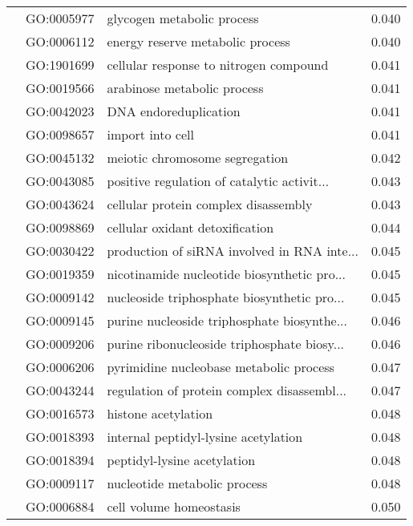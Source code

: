 \begin{longtable}{lllr}
   & GO:0005977 &                   glycogen metabolic process &         0.040 \\
   & GO:0006112 &             energy reserve metabolic process &         0.040 \\
   & GO:1901699 &       cellular response to nitrogen compound &         0.041 \\
   & GO:0019566 &                  arabinose metabolic process &         0.041 \\
   & GO:0042023 &                        DNA endoreduplication &         0.041 \\
   & GO:0098657 &                             import into cell &         0.041 \\
   & GO:0045132 &               meiotic chromosome segregation &         0.042 \\
   & GO:0043085 &  positive regulation of catalytic activit... &         0.043 \\
   & GO:0043624 &         cellular protein complex disassembly &         0.043 \\
   & GO:0098869 &              cellular oxidant detoxification &         0.044 \\
   & GO:0030422 &  production of siRNA involved in RNA inte... &         0.045 \\
   & GO:0019359 &  nicotinamide nucleotide biosynthetic pro... &         0.045 \\
   & GO:0009142 &  nucleoside triphosphate biosynthetic pro... &         0.045 \\
   & GO:0009145 &  purine nucleoside triphosphate biosynthe... &         0.046 \\
   & GO:0009206 &  purine ribonucleoside triphosphate biosy... &         0.046 \\
   & GO:0006206 &      pyrimidine nucleobase metabolic process &         0.047 \\
   & GO:0043244 &  regulation of protein complex disassembl... &         0.047 \\
   & GO:0016573 &                          histone acetylation &         0.048 \\
   & GO:0018393 &         internal peptidyl-lysine acetylation &         0.048 \\
   & GO:0018394 &                  peptidyl-lysine acetylation &         0.048 \\
   & GO:0009117 &                 nucleotide metabolic process &         0.048 \\
   & GO:0006884 &                      cell volume homeostasis &         0.050 \\

\end{longtable}
